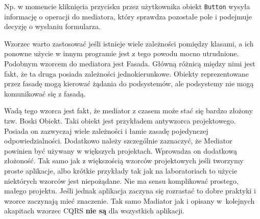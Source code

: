 Np. w momencie kliknięcia przycisku przez użytkownika obiekt \texttt{Button} wysyła informację o operacji do mediatora, który sprawdza pozostałe pole i podejmuje decyzję o wysłaniu formularza. 

Wzorzec warto zastosować jeśli istnieje wiele zależności pomiędzy klasami, a ich ponowne użycie w innym programie jest z tego powodu mocno utrudnione. Podobnym wzorcem do mediatora jest Fasada. Główną różnicą między nimi jest fakt, że ta druga posiada zależności jednokierunkowe. Obiekty reprezentowane przez fasadę mogą kierować żądania do podsystemów, ale podsystemy nie mogą komunikować się z fasadą.

Wadą tego wzorca jest fakt, że mediator z czasem może stać się bardzo złożony tzw. Boski Obiekt. Taki obiekt jest przykładem antywzorca projektowego. Posiada on zazwyczaj wiele zależności i łamie zasadę pojedynczej odpowiedzialności. Dodatkowo należy szczególnie zaznaczyć, że Mediator powinien być używany w większych projektach. Wprowadza on dodatkową złożoność. Tak samo jak z większością wzorców projektowych jeśli tworzymy proste aplikacje, albo krótkie przykłady tak jak na laboratoriach to użycie niektórych wzorców jest niepożądane. Nie ma sensu komplikować prostego, małego projektu.
Jeśli jednak aplikacja zaczyna się rozrastać to dobre praktyki i wzorce zaczynają mieć znaczenie. %
Tak samo Madiator jak i opisany w~kolejnych akapitach wzorzec CQRS \textbf{nie są} dla wszystkich aplikacji.

